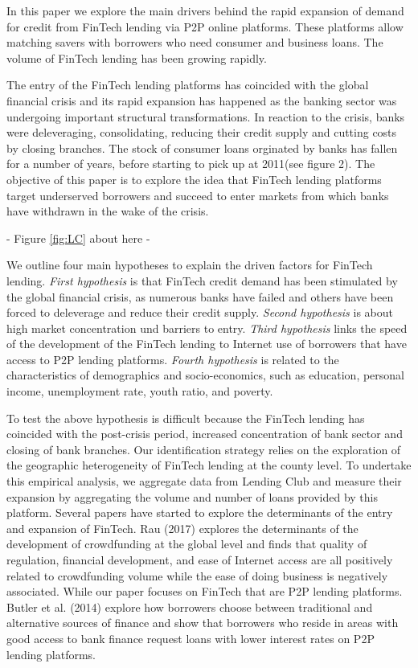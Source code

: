 \documentclass[11pt, a4paper, leqno]{article}
\begin{document}
In this paper we explore the main drivers behind the rapid expansion of demand for credit from FinTech lending via P2P online platforms. These platforms allow matching savers with borrowers who need consumer and business loans. The volume of FinTech lending has been growing rapidly.  

The entry of the FinTech lending platforms has coincided with the global financial crisis and its rapid expansion has happened as the banking sector was undergoing important structural transformations. In reaction to the crisis, banks were deleveraging, consolidating, reducing their credit supply and cutting costs by closing branches. The stock of consumer loans orginated by banks has fallen for a number of years, before starting to pick up at 2011(see figure 2). The objective of this paper is to explore the idea that FinTech lending platforms target underserved borrowers and succeed to enter markets from which banks have withdrawn in the wake of the crisis.  

\begin{center}
- Figure \ref{fig:LC} about here -
\end{center}

We outline four main hypotheses to explain the driven factors for FinTech lending. 
\textit{First hypothesis} is that FinTech credit demand has been stimulated by the global financial crisis, as numerous banks have failed and others have been forced to deleverage and reduce their credit supply. \textit{Second hypothesis} is about high market concentration und barriers to entry.  \textit{Third hypothesis} links the speed of the development of the FinTech lending to Internet use of borrowers that have access to P2P lending platforms. \textit{Fourth hypothesis} is related to the characteristics of demographics and socio-economics, such as education, personal income, unemployment rate, youth ratio, and poverty.

To test the above hypothesis is difficult because the FinTech lending has coincided with the post-crisis period, increased concentration of bank sector and closing of bank branches. Our identification strategy relies on the exploration of the geographic heterogeneity of FinTech lending at the county level. To undertake this empirical analysis, we aggregate data from Lending Club and measure their expansion by aggregating the volume and number of loans provided by this platform. 
Several papers have started to explore the determinants of the entry and expansion of FinTech. Rau (2017) explores the determinants of the development of crowdfunding at the global level and finds that quality of regulation, financial development, and ease of Internet access are all positively related to crowdfunding volume while the ease of doing business is negatively associated. While our paper focuses on FinTech that are P2P lending platforms. Butler et al. (2014) explore how borrowers choose between traditional and alternative sources of finance and show that borrowers who reside in areas with good access to bank finance request loans with lower interest rates on P2P lending platforms.
\end{document}
